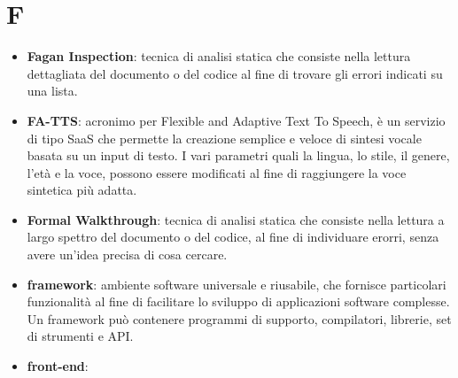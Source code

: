 \section{F}
\begin{itemize} 
	\item \textbf{Fagan Inspection}: tecnica di analisi statica che consiste nella lettura dettagliata del documento o del codice al fine di trovare gli errori indicati su una lista.
	\item \textbf{FA-TTS}: acronimo per Flexible and Adaptive Text To Speech, è un servizio di tipo SaaS che permette la creazione semplice e veloce di sintesi vocale basata su un input di testo. I vari parametri quali la lingua, lo stile, il genere, l'età e la voce, possono essere modificati al fine di raggiungere la voce sintetica più adatta.
	\item \textbf{Formal Walkthrough}: tecnica di analisi statica che consiste nella lettura a largo spettro del documento o del codice, al fine di individuare erorri, senza avere un'idea precisa di cosa cercare.
	\item \textbf{framework}: ambiente software universale e riusabile, che fornisce particolari funzionalità al fine di facilitare lo sviluppo di applicazioni software complesse. Un framework può contenere programmi di supporto, compilatori, librerie, set di strumenti e API.
 	\item \textbf{front-end}:
\end{itemize}